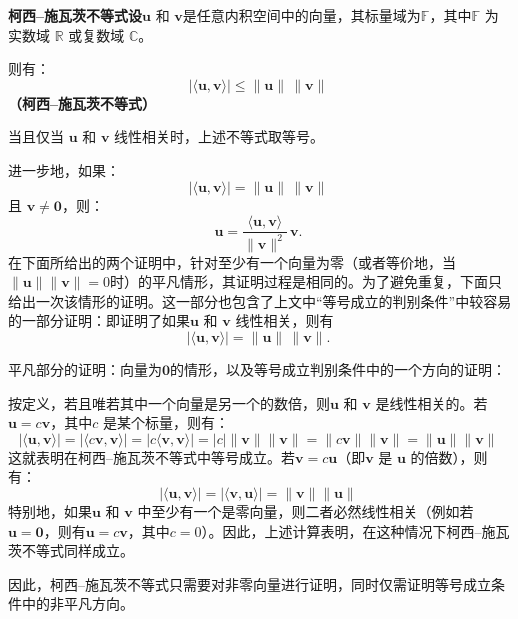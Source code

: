 \textbf{柯西–施瓦茨不等式设}$\mathbf{u}$ 和 $\mathbf{v}$是任意内积空间中的向量，其标量域为$\mathbb{F}$，其中$\mathbb{F}$ 为实数域 $\mathbb{R}$ 或复数域 $\mathbb{C}$。

则有：
$$
\left| \langle \mathbf{u}, \mathbf{v} \rangle \right| \leq \|\mathbf{u}\| \, \|\mathbf{v}\|~
$$
\textbf{（柯西–施瓦茨不等式）}

当且仅当 $\mathbf{u}$ 和 $\mathbf{v}$ 线性相关时，上述不等式取等号。

进一步地，如果：
$$
\left| \langle \mathbf{u}, \mathbf{v} \rangle \right| = \|\mathbf{u}\| \, \|\mathbf{v}\|~
$$
且 $\mathbf{v} \neq \mathbf{0}$，则：
$$
\mathbf{u} = \frac{ \langle \mathbf{u}, \mathbf{v} \rangle }{ \|\mathbf{v}\|^2 } \, \mathbf{v}.~
$$
在下面所给出的两个证明中，针对至少有一个向量为零（或者等价地，当$\|\mathbf{u}\|\|\mathbf{v}\| = 0$时）的平凡情形，其证明过程是相同的。为了避免重复，下面只给出一次该情形的证明。这一部分也包含了上文中“等号成立的判别条件”中较容易的一部分证明：即证明了如果$\mathbf{u}$ 和 $\mathbf{v}$ 线性相关，则有
$$
\left| \langle \mathbf{u}, \mathbf{v} \rangle \right| = \|\mathbf{u}\| \, \|\mathbf{v}\|.~
$$

平凡部分的证明：向量为$\mathbf{0}$的情形，以及等号成立判别条件中的一个方向的证明：

按定义，若且唯若其中一个向量是另一个的数倍，则$\mathbf{u}$ 和 $\mathbf{v}$ 是线性相关的。若$\mathbf{u} = c\mathbf{v}$，其中$c$ 是某个标量，则有：
$$
|\langle \mathbf{u}, \mathbf{v} \rangle| = |\langle c\mathbf{v}, \mathbf{v} \rangle| = |c\langle \mathbf{v}, \mathbf{v} \rangle| = |c| \|\mathbf{v}\|\|\mathbf{v}\| = \|c\mathbf{v}\|\|\mathbf{v}\| = \|\mathbf{u}\|\|\mathbf{v}\|~
$$
这就表明在柯西–施瓦茨不等式中等号成立。若$\mathbf{v} = c\mathbf{u}$（即$\mathbf{v}$ 是 $\mathbf{u}$ 的倍数），则有：
$$
|\langle \mathbf{u}, \mathbf{v} \rangle| = |\langle \mathbf{v}, \mathbf{u} \rangle| = \|\mathbf{v}\|\|\mathbf{u}\|~
$$
特别地，如果$\mathbf{u}$ 和 $\mathbf{v}$ 中至少有一个是零向量，则二者必然线性相关（例如若
$\mathbf{u} = \mathbf{0}$，则有$\mathbf{u} = c\mathbf{v}$，其中$c = 0$）。因此，上述计算表明，在这种情况下柯西–施瓦茨不等式同样成立。

因此，柯西–施瓦茨不等式只需要对非零向量进行证明，同时仅需证明等号成立条件中的非平凡方向。

